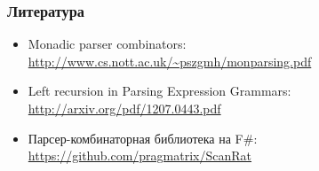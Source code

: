 \documentclass{beamer}
\begin{document}
\begin{frame}[fragile]
  \transwipe[direction=90]
  \frametitle{Литература}
\begin{itemize}
  \item Monadic parser combinators: \url{http://www.cs.nott.ac.uk/~pszgmh/monparsing.pdf}
  \item Left recursion in Parsing Expression Grammars: \url{http://arxiv.org/pdf/1207.0443.pdf}
  \item Парсер-комбинаторная библиотека на F\#: \url{https://github.com/pragmatrix/ScanRat}
\end{itemize}

\end{frame}
\end{document}

